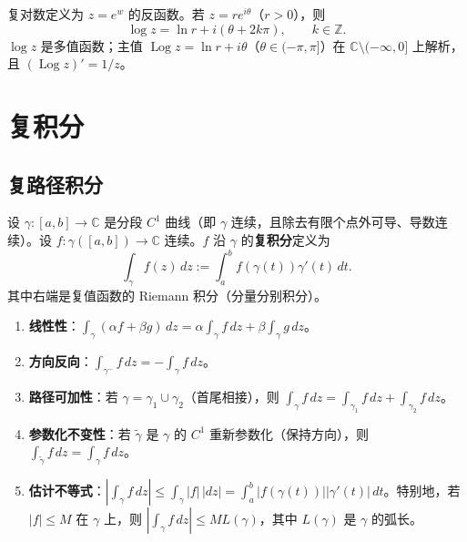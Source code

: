 \begin{example}[复对数函数的多值性]\label{ex:ca_log_multivalued}
复对数定义为 $z = e^w$ 的反函数。若 $z = re^{i\theta}$（$r > 0$），则
\[
\log z = \ln r + i(\theta + 2k\pi), \qquad k \in \mathbb{Z}.
\]
$\log z$ 是多值函数；主值 $\operatorname{Log} z = \ln r + i\theta$（$\theta \in (-\pi, \pi]$）在 $\mathbb{C} \setminus (-\infty, 0]$ 上解析，且 $(\operatorname{Log} z)' = 1/z$。
\end{example}

\section{复积分}

\subsection{复路径积分}

\begin{definition}[复路径与积分]\label{def:ca_contour_integral}
设 $\gamma: [a, b] \to \mathbb{C}$ 是分段 $C^1$ 曲线（即 $\gamma$ 连续，且除去有限个点外可导、导数连续）。设 $f: \gamma([a, b]) \to \mathbb{C}$ 连续。$f$ 沿 $\gamma$ 的\textbf{复积分}定义为
\[
\int_\gamma f(z) \, dz := \int_a^b f(\gamma(t)) \gamma'(t) \, dt.
\]
其中右端是复值函数的 Riemann 积分（分量分别积分）。
\end{definition}

\begin{proposition}[复积分的基本性质]\label{prop:ca_contour_integral_props}
\begin{enumerate}[label=(\roman*)]
    \item \textbf{线性性}：$\int_\gamma (\alpha f + \beta g) \, dz = \alpha \int_\gamma f \, dz + \beta \int_\gamma g \, dz$。
    \item \textbf{方向反向}：$\int_{\gamma^-} f \, dz = -\int_\gamma f \, dz$。
    \item \textbf{路径可加性}：若 $\gamma = \gamma_1 \cup \gamma_2$（首尾相接），则 $\int_\gamma f \, dz = \int_{\gamma_1} f \, dz + \int_{\gamma_2} f \, dz$。
    \item \textbf{参数化不变性}：若 $\tilde{\gamma}$ 是 $\gamma$ 的 $C^1$ 重新参数化（保持方向），则 $\int_{\tilde{\gamma}} f \, dz = \int_\gamma f \, dz$。
    \item \textbf{估计不等式}：$\left| \int_\gamma f \, dz \right| \le \int_\gamma |f| \, |dz| = \int_a^b |f(\gamma(t))| |\gamma'(t)| \, dt$。特别地，若 $|f| \le M$ 在 $\gamma$ 上，则 $\left| \int_\gamma f \, dz \right| \le M L(\gamma)$，其中 $L(\gamma)$ 是 $\gamma$ 的弧长。
\end{enumerate}
\end{proposition}

